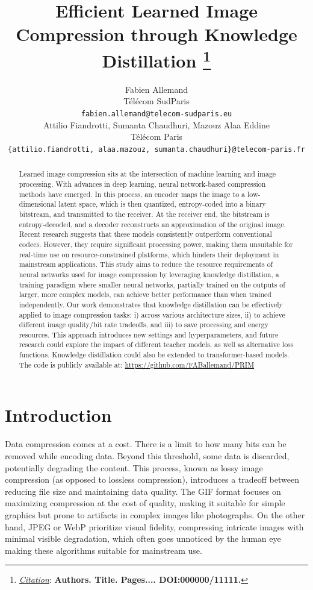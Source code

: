 \documentclass{article}
\title{Efficient Learned Image Compression through Knowledge Distillation
\thanks{\textit{\underline{Citation}}: 
\textbf{Authors. Title. Pages.... DOI:000000/11111.}} 
}
\author{
	Fabien Allemand\\
	Télécom SudParis\\
	\texttt{fabien.allemand@telecom-sudparis.eu}\\
	\And
	Attilio Fiandrotti, Sumanta Chaudhuri, Mazouz Alaa Eddine\\
	Télécom Paris\\
	\texttt{\{attilio.fiandrotti, alaa.mazouz, sumanta.chaudhuri\}@telecom-paris.fr}\\
}
\begin{document}
\maketitle

\begin{abstract}
	Learned image compression sits at the intersection of machine learning and image processing. With advances in deep learning, neural network-based compression methods have emerged. In this process, an encoder maps the image to a low-dimensional latent space, which is then quantized, entropy-coded into a binary bitstream, and transmitted to the receiver. At the receiver end, the bitstream is entropy-decoded, and a decoder reconstructs an approximation of the original image. Recent research suggests that these models consistently outperform conventional codecs. However, they require significant processing power, making them unsuitable for real-time use on resource-constrained platforms, which hinders their deployment in mainstream applications. This study aims to reduce the resource requirements of neural networks used for image compression by leveraging knowledge distillation, a training paradigm where smaller neural networks, partially trained on the outputs of larger, more complex models, can achieve better performance than when trained independently. Our work demonstrates that knowledge distillation can be effectively applied to image compression tasks: i) across various architecture sizes, ii) to achieve different image quality/bit rate tradeoffs, and iii) to save processing and energy resources. This approach introduces new settings and hyperparameters, and future research could explore the impact of different teacher models, as well as alternative loss functions. Knowledge distillation could also be extended to transformer-based models. The code is publicly available at: \url{https://github.com/FABallemand/PRIM}
\end{abstract}


\section{Introduction}
Data compression comes at a cost. There is a limit to how many bits can be removed while encoding data. Beyond this threshold, some data is discarded, potentially degrading the content. This process, known as lossy image compression (as opposed to lossless compression), introduces a tradeoff between reducing file size and maintaining data quality. The GIF format focuses on maximizing compression at the cost of quality, making it suitable for simple graphics but prone to artifacts in complex images like photographs. On the other hand, JPEG or WebP prioritize visual fidelity, compressing intricate images with minimal visible degradation, which often goes unnoticed by the human eye making these algorithms suitable for mainstream use.
\end{document}
